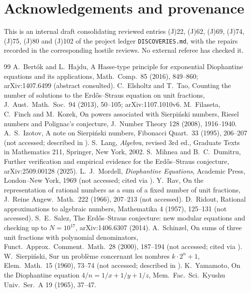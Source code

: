 \documentclass[11pt,reqno]{amsart}
\theoremstyle{definition}
\begin{document}
\fussy
\section*{Acknowledgements and provenance}
This is an internal draft consolidating reviewed entries (J)22, (J)62,
(J)69, (J)74, (J)75, (J)80 and (J)102 of the project ledger
\texttt{DISCOVERIES.md}, with the repairs recorded in the corresponding
hostile reviews.  No external referee has checked it.

\begin{thebibliography}{99}
 A.~Bert\'ok and L.~Hajdu, A Hasse-type principle for
exponential Diophantine equations and its applications, Math.\ Comp.\ 85
(2016), 849--860; arXiv:1407.6499 (abstract consulted).
 C.~Elsholtz and T.~Tao, Counting the number of solutions to the
Erd\H{o}s--Straus equation on unit fractions, J.\ Aust.\ Math.\ Soc.\ 94
(2013), 50--105; arXiv:1107.1010v6.
 M.~Filaseta, C.~Finch and M.~Kozek, On powers associated with
Sierpi\'nski numbers, Riesel numbers and Polignac's conjecture, J.\ Number
Theory 128 (2008), 1916--1940.
 A.~S.~Izotov, A note on Sierpi\'nski numbers, Fibonacci
Quart.\ 33 (1995), 206--207 (not accessed; described in \cite[pp.~3--4]{FFK}).
 S.~Lang, \emph{Algebra}, revised 3rd ed., Graduate Texts in
Mathematics 211, Springer, New York, 2002.
 S.~Mihnea and B.~C.~Dumitru, Further verification and empirical
evidence for the Erd\H{o}s--Straus conjecture, arXiv:2509.00128 (2025).
 L.~J.~Mordell, \emph{Diophantine Equations}, Academic
Press, London--New York, 1969 (not accessed; cited via \cite{ET}).
 Y.~Rav, On the representation of rational numbers as a sum of
a fixed number of unit fractions, J.\ Reine Angew.\ Math.\ 222 (1966),
207--213 (not accessed).
 D.~Ridout, Rational approximations to algebraic numbers,
Mathematika 4 (1957), 125--131 (not accessed).
 S.~E.~Salez, The Erd\H{o}s--Straus conjecture: new modular
equations and checking up to $N=10^{17}$, arXiv:1406.6307 (2014).
 A.~Schinzel, On sums of three unit fractions with
polynomial denominators, Funct.\ Approx.\ Comment.\ Math.\ 28 (2000),
187--194 (not accessed; cited via \cite{ET}).
 W.~Sierpi\'nski, Sur un probl\`eme concernant les
nombres $k\cdot2^n+1$, Elem.\ Math.\ 15 (1960), 73--74 (not accessed;
described in \cite[\S1]{FFK}).
 K.~Yamamoto, On the Diophantine equation
$4/n=1/x+1/y+1/z$, Mem.\ Fac.\ Sci.\ Kyushu Univ.\ Ser.\ A 19 (1965), 37--47.

\end{thebibliography}
\end{document}
